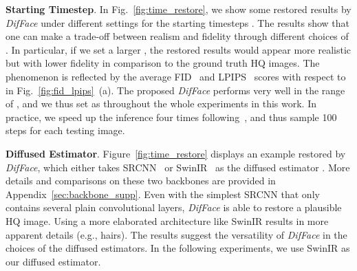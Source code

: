 \documentclass[10pt,twocolumn,letterpaper]{article}
\begin{document}
\noindent\textbf{Starting Timestep}. In Fig.~\ref{fig:time_restore}, we show some restored results by \textit{DifFace} under different settings for the starting timesteps .
The results show that one can make a trade-off between realism and fidelity through different choices of . In particular, if we set a larger , the restored results would appear more realistic but with lower fidelity in comparison to the ground truth HQ images. The phenomenon is reflected by the average FID~\cite{heusel2017gans} and LPIPS~\cite{zhang2018unreasonable} scores with respect to  in Fig.~\ref{fig:fid_lpips}~(a).
The proposed \textit{DifFace} performs very well in the range of , and we thus set  as  throughout the whole experiments in this work. In practice, we speed up the inference four times following~\cite{nichol2021improved}, and thus sample 100 steps for each testing image.

\noindent\textbf{Diffused Estimator}. Figure~\ref{fig:time_restore} displays an example restored by \textit{DifFace}, which either takes SRCNN~\cite{dong2015image} or SwinIR~\cite{liang2021swinir} as the diffused estimator .
More details and comparisons on these two backbones are provided in Appendix~\ref{sec:backbone_supp}.
Even with the simplest SRCNN that only contains several plain convolutional layers, \textit{DifFace} is able to restore a plausible HQ image. Using a more elaborated architecture like SwinIR results in more apparent details (e.g., hairs). The results suggest the versatility of \textit{DifFace} in the choices of the diffused estimators. In the following experiments, we use SwinIR as our diffused estimator. 
\end{document}
